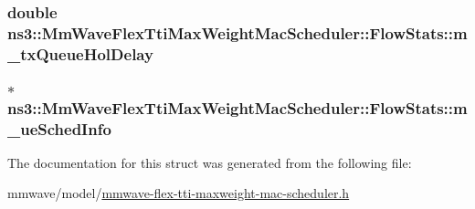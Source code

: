 \subsubsection[{\texorpdfstring{m\+\_\+tx\+Queue\+Hol\+Delay}{m_txQueueHolDelay}}]{\setlength{\rightskip}{0pt plus 5cm}double ns3\+::\+Mm\+Wave\+Flex\+Tti\+Max\+Weight\+Mac\+Scheduler\+::\+Flow\+Stats\+::m\+\_\+tx\+Queue\+Hol\+Delay}\hypertarget{structns3_1_1MmWaveFlexTtiMaxWeightMacScheduler_1_1FlowStats_a8db53a6b0983feca807d9d65c3d6959d}{}\label{structns3_1_1MmWaveFlexTtiMaxWeightMacScheduler_1_1FlowStats_a8db53a6b0983feca807d9d65c3d6959d}
\subsubsection[{\texorpdfstring{m\+\_\+ue\+Sched\+Info}{m_ueSchedInfo}}]{$\ast$ ns3\+::\+Mm\+Wave\+Flex\+Tti\+Max\+Weight\+Mac\+Scheduler\+::\+Flow\+Stats\+::m\+\_\+ue\+Sched\+Info}\hypertarget{structns3_1_1MmWaveFlexTtiMaxWeightMacScheduler_1_1FlowStats_a170d07060363023e2e15ef238db7505b}{}\label{structns3_1_1MmWaveFlexTtiMaxWeightMacScheduler_1_1FlowStats_a170d07060363023e2e15ef238db7505b}


The documentation for this struct was generated from the following file\+:\begin{DoxyCompactItemize}
\item 
mmwave/model/\hyperlink{mmwave-flex-tti-maxweight-mac-scheduler_8h}{mmwave-\/flex-\/tti-\/maxweight-\/mac-\/scheduler.\+h}\end{DoxyCompactItemize}
